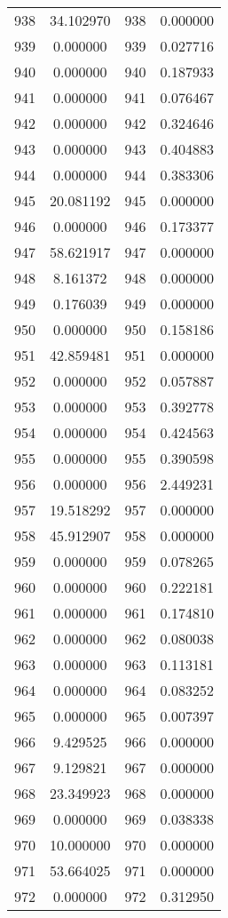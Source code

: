\documentclass[12pt]{article}
\begin{document}
\begin{longtable}{@{}cccc@{}}
938 & 34.102970 & 938 & 0.000000 \\
939 & 0.000000 & 939 & 0.027716 \\
940 & 0.000000 & 940 & 0.187933 \\
941 & 0.000000 & 941 & 0.076467 \\
942 & 0.000000 & 942 & 0.324646 \\
943 & 0.000000 & 943 & 0.404883 \\
944 & 0.000000 & 944 & 0.383306 \\
945 & 20.081192 & 945 & 0.000000 \\
946 & 0.000000 & 946 & 0.173377 \\
947 & 58.621917 & 947 & 0.000000 \\
948 & 8.161372 & 948 & 0.000000 \\
949 & 0.176039 & 949 & 0.000000 \\
950 & 0.000000 & 950 & 0.158186 \\
951 & 42.859481 & 951 & 0.000000 \\
952 & 0.000000 & 952 & 0.057887 \\
953 & 0.000000 & 953 & 0.392778 \\
954 & 0.000000 & 954 & 0.424563 \\
955 & 0.000000 & 955 & 0.390598 \\
956 & 0.000000 & 956 & 2.449231 \\
957 & 19.518292 & 957 & 0.000000 \\
958 & 45.912907 & 958 & 0.000000 \\
959 & 0.000000 & 959 & 0.078265 \\
960 & 0.000000 & 960 & 0.222181 \\
961 & 0.000000 & 961 & 0.174810 \\
962 & 0.000000 & 962 & 0.080038 \\
963 & 0.000000 & 963 & 0.113181 \\
964 & 0.000000 & 964 & 0.083252 \\
965 & 0.000000 & 965 & 0.007397 \\
966 & 9.429525 & 966 & 0.000000 \\
967 & 9.129821 & 967 & 0.000000 \\
968 & 23.349923 & 968 & 0.000000 \\
969 & 0.000000 & 969 & 0.038338 \\
970 & 10.000000 & 970 & 0.000000 \\
971 & 53.664025 & 971 & 0.000000 \\
972 & 0.000000 & 972 & 0.312950 \\

\end{longtable}
\end{document}
